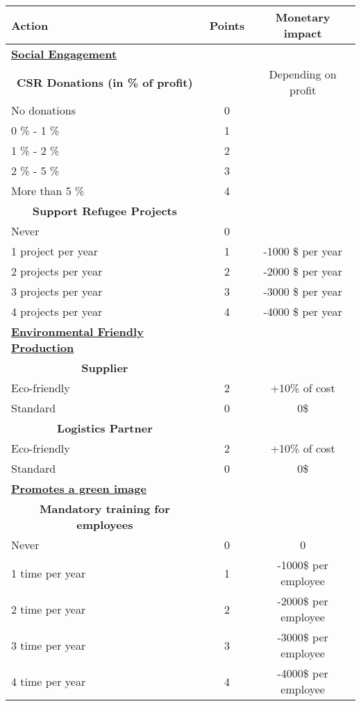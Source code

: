 \begin{longtable}[]{l|c|c}
     \textbf{Action} & \textbf{Points} & \textbf{Monetary impact} \\
     \hline \hline
     \underline{\textbf{Social Engagement}} & & \\ [1ex]
     \multicolumn{1}{c|}{\textbf{CSR Donations (in \% of profit)}} & & Depending on profit \\
     No donations & 0 &  \\
     0 \% - 1 \% & 1 &  \\
     1 \% - 2 \% & 2 &   \\
     2 \% - 5 \% & 3 &   \\
     More than 5 \% & 4 &   \\ [1ex]
     \multicolumn{1}{c|}{\textbf{Support Refugee Projects}} & & \\
     Never & 0 &  \\
     1 project per year & 1 & -1000 \$ per year  \\
     2 projects per year & 2 & -2000 \$ per year   \\
     3 projects per year & 3 & -3000 \$ per year  \\
     4 projects per year & 4 & -4000 \$ per year  \\
     \hline \hline
     \underline{\textbf{Environmental Friendly Production}} & & \\ [1ex]
     \multicolumn{1}{c|}{\textbf{Supplier}} & & \\
     Eco-friendly & 2 & +10\% of cost \\
     Standard & 0 & 0\$  \\
     \multicolumn{1}{c|}{\textbf{Logistics Partner}} & & \\
     Eco-friendly & 2 & +10\% of cost \\
     Standard & 0 & 0\$  \\
     \hline \hline
     \underline{\textbf{Promotes a green image}} & & \\ [1ex]
     \multicolumn{1}{c|}{\textbf{Mandatory training for employees}} & & \\
     Never & 0 & 0 \\
     1 time per year & 1 & -1000\$ per employee  \\
     2 time per year & 2 & -2000\$ per employee  \\
     3 time per year & 3 & -3000\$ per employee  \\
     4 time per year & 4 & -4000\$ per employee  \\

\end{longtable}
